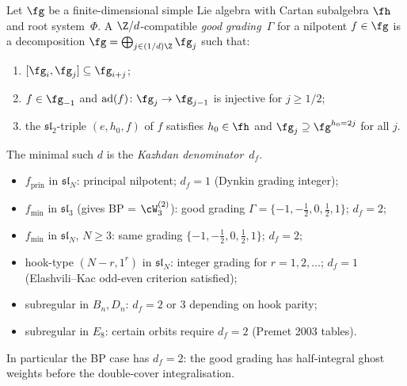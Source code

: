 \begin{definition}
\label{def:good-1-over-d-grading}
Let $\fg$ be a finite-dimensional simple Lie algebra with Cartan
subalgebra $\fh$ and root system~$\Phi$. A $\Z/d$-compatible
\emph{good grading}~$\Gamma$ for a nilpotent $f \in \fg$ is a
decomposition $\fg = \bigoplus_{j \in (1/d)\Z} \fg_{j}$ such that:
\begin{enumerate}[label=\textup{(G\arabic*)},nosep]
\item $[\fg_{i}, \fg_{j}] \subseteq \fg_{i+j}$;
\item $f \in \fg_{-1}$ and $\operatorname{ad}(f)\colon
 \fg_{j} \to \fg_{j-1}$ is injective for $j \ge 1/2$;
\item the $\mathfrak{sl}_{2}$-triple $(e, h_{0}, f)$ of $f$
 satisfies $h_{0} \in \fh$ and
 $\fg_{j} \supseteq \fg^{h_{0} = 2j}$ for all $j$.
\end{enumerate}
The minimal such $d$ is the \emph{Kazhdan denominator}~$d_{f}$.
\end{definition}

\begin{example}
\label{ex:kazhdan-denominator-table}
\mbox{}
\begin{itemize}[nosep]
\item $f_{\mathrm{prin}}$ in $\mathfrak{sl}_{N}$: principal nilpotent;
 $d_{f} = 1$ (Dynkin grading integer);
\item $f_{\min}$ in $\mathfrak{sl}_{3}$ (gives BP = $\cW_{3}^{(2)}$):
 good grading $\Gamma = \{-1, -\tfrac{1}{2}, 0, \tfrac{1}{2}, 1\}$;
 $d_{f} = 2$;
\item $f_{\min}$ in $\mathfrak{sl}_{N}$, $N \ge 3$: same grading
 $\{-1, -\tfrac{1}{2}, 0, \tfrac{1}{2}, 1\}$; $d_{f} = 2$;
\item hook-type $(N-r, 1^{r})$ in $\mathfrak{sl}_{N}$: integer
 grading for $r = 1, 2, \ldots$; $d_{f} = 1$ (Elashvili--Kac
 odd-even criterion satisfied);
\item subregular in $B_{n}, D_{n}$: $d_{f} = 2$ or $3$ depending
 on hook parity;
\item subregular in $E_{8}$: certain orbits require $d_{f} = 2$
 (Premet 2003 tables).
\end{itemize}
In particular the BP case has $d_{f} = 2$: the good grading has
half-integral ghost weights before the double-cover
integralisation.
\end{example}

